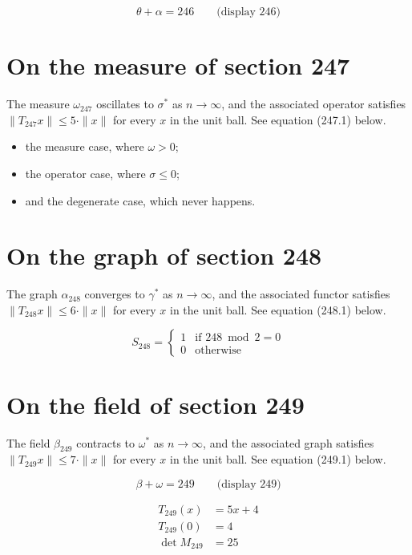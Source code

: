 \documentclass{article}
\begin{document}
$$
\theta + \alpha = 246 \qquad \text{(display 246)}
$$

\section{On the measure of section 247}
The measure $\omega_{247}$ oscillates to $\sigma^{*}$ as $n \to \infty$,
and the associated operator satisfies $\|T_{247} x\| \leq 5 \cdot \|x\|$
for every $x$ in the unit ball. See equation (247.1) below.

\begin{itemize}
  \item the measure case, where $\omega > 0$;
  \item the operator case, where $\sigma \leq 0$;
  \item and the degenerate case, which never happens.
\end{itemize}

\section{On the graph of section 248}
The graph $\alpha_{248}$ converges to $\gamma^{*}$ as $n \to \infty$,
and the associated functor satisfies $\|T_{248} x\| \leq 6 \cdot \|x\|$
for every $x$ in the unit ball. See equation (248.1) below.

\begin{equation}
S_{248} = \begin{cases} 1 & \text{if } 248 \bmod 2 = 0 \\ 0 & \text{otherwise} \end{cases}
\end{equation}

\section{On the field of section 249}
The field $\beta_{249}$ contracts to $\omega^{*}$ as $n \to \infty$,
and the associated graph satisfies $\|T_{249} x\| \leq 7 \cdot \|x\|$
for every $x$ in the unit ball. See equation (249.1) below.

$$
\beta + \omega = 249 \qquad \text{(display 249)}
$$

\begin{align}
T_{249}(x) &= 5 x + 4 \\
T_{249}(0) &= 4 \\
\det M_{249} &= 25
\end{align}
\end{document}
